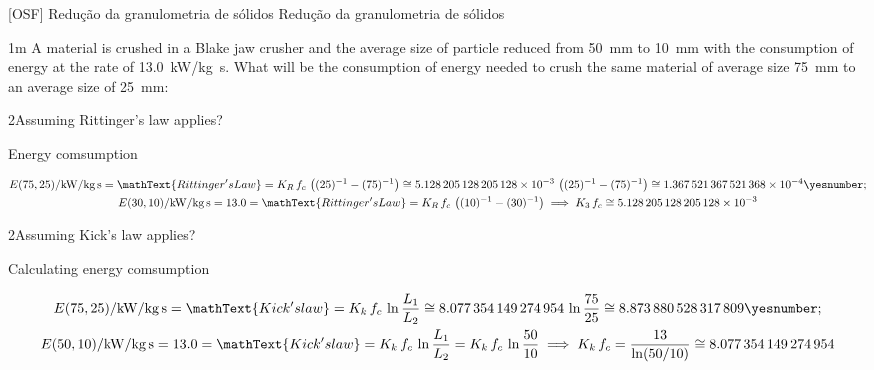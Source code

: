 \documentclass["./OSF-Exercises_Resolutions.tex"]{subfiles}
\begin{document}

[OSF]
{Redução da granulometria de sólidos} %
{Redução da granulometria de sólidos} %

\begin{questionBox}1m{} %
  A material is crushed in a Blake jaw crusher and the average size of particle reduced from \qty*{50}{\mm} to \qty*{10}{\mm} with the consumption of energy at the rate of \qty*{13.0}{\kilo\W/\kg.\s}. What will be the consumption of energy needed to crush the same material of average size \qty*{75}{\mm} to an average size of \qty*{25}{\mm}:

  \begin{questionBox}2{Assuming Rittinger's law applies?} %
    \answer{\eqref{eq:q2.1 answer}}
    
    Energy comsumption
    \begin{tcolorbox}
      \begin{gather*}
        E(75,25)/\unit{\kilo\W/\kg.\s}
        = \mathText{Rittinger's Law}
        = K_R\,f_c
        \,\left( (25)^{-1}-(75)^{-1} \right)
        \cong \num{5.128205128205128e-3}
        \,\left( (25)^{-1}-(75)^{-1} \right)
        \cong \num{1.367521367521368e-4}
        \yesnumber\label{eq:q2.1 answer}
        ; \\
        E(30,10)/\unit{\kilo\W/\kg.\s}
        = 13.0
        = \mathText{Rittinger's Law}
        = K_R\,f_c
        \,\left( (10)^{-1}-(30)^{-1} \right)
        \implies 
        K_3\,f_c
        \cong \num{5.128205128205128e-3}
      \end{gather*}
    \end{tcolorbox}

  \end{questionBox}
  \begin{questionBox}2{Assuming Kick's law applies?} %
    \answer{\eqref{eq:q2.2 answer}}

    Calculating energy comsumption
    \begin{tcolorbox}
      \begin{gather*}
        E(75,25)/\unit{\kilo\W/\kg.\s}
        = \mathText{Kick's law}
        = K_k\,f_c\,\ln{
          \frac{L_1}{L_2}
        }
        \cong \num{8.077354149274954}
        \,\ln{
          \frac{75}{25}
        }
        \cong \num{8.873880528317809}
        \yesnumber\label{eq:q2.2 answer}
        ; \\
        E(50,10)/\unit{\kilo\W/\kg.\s}
        = 13.0
        = \mathText{Kick's law}
        = K_k\,f_c\,\ln{
          \frac{L_1}{L_2}
        }
        = K_k\,f_c\,\ln{
          \frac{50}{10}
        }
        \implies
        K_k\,f_c
        = \frac{13}{\ln(50/10)}
        \cong \num{8.077354149274954}
      \end{gather*}
    \end{tcolorbox}
  \end{questionBox}


\end{questionBox}
\end{document}
